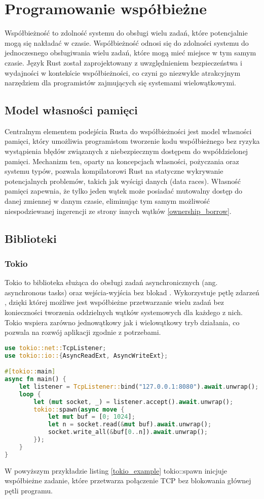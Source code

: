 \section{Programowanie współbieżne}
Współbieżność to zdolność systemu do obsługi wielu zadań, które potencjalnie mogą się nakładać w czasie. Współbieżność odnosi się do zdolności systemu do jednoczesnego obsługiwania wielu zadań, które mogą mieć miejsce w tym samym czasie. Język Rust został zaprojektowany z uwzględnieniem bezpieczeństwa i wydajności w kontekście współbieżności, co czyni go niezwykle atrakcyjnym narzędziem dla programistów zajmujących się systemami wielowątkowymi.

\subsection{Model własności pamięci}
Centralnym elementem podejścia Rusta do współbieżności jest model własności pamięci, który umożliwia programistom tworzenie kodu współbieżnego bez ryzyka wystąpienia błędów związanych z niebezpiecznym dostępem do współdzielonej pamięci. Mechanizm ten, oparty na koncepcjach własności, pożyczania oraz systemu typów, pozwala kompilatorowi Rust na statyczne wykrywanie potencjalnych problemów, takich jak wyścigi danych (data races). Własność pamięci zapewnia, że tylko jeden wątek może posiadać mutowalny dostęp do danej zmiennej w danym czasie, eliminując tym samym możliwość niespodziewanej ingerencji ze strony innych wątków \ref{ownership_borrow}.

\subsection{Biblioteki}
\subsubsection{Tokio}
Tokio to biblioteka służąca do obsługi zadań asynchronicznych (ang. asynchronous tasks) oraz wejścia-wyjścia bez blokad . Wykorzystuje pętlę zdarzeń , dzięki której możliwe jest współbieżne przetwarzanie wielu zadań bez konieczności tworzenia oddzielnych wątków systemowych dla każdego z nich. Tokio wspiera zarówno jednowątkowy jak i wielowątkowy tryb działania, co pozwala na rozwój aplikacji zgodnie z potrzebami.

\begin{lstlisting}[language=Rust, caption=Przykład użycia Tokio, label=tokio_example]
use tokio::net::TcpListener;
use tokio::io::{AsyncReadExt, AsyncWriteExt};

#[tokio::main]
async fn main() {
    let listener = TcpListener::bind("127.0.0.1:8080").await.unwrap();
    loop {
        let (mut socket, _) = listener.accept().await.unwrap();
        tokio::spawn(async move {
            let mut buf = [0; 1024];
            let n = socket.read(&mut buf).await.unwrap();
            socket.write_all(&buf[0..n]).await.unwrap();
        });
    }
}
\end{lstlisting}
W powyższym przykładzie listing \ref{tokio_example} tokio::spawn inicjuje współbieżne zadanie, które przetwarza połączenie TCP bez blokowania głównej pętli programu.

